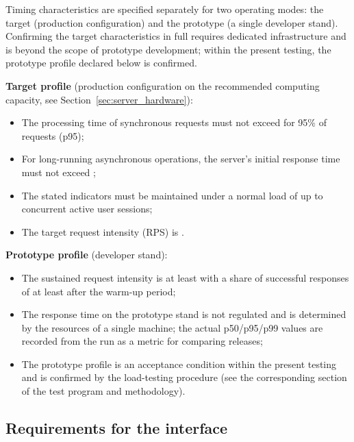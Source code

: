 \documentclass[12pt,a4paper]{extarticle}
\begin{document}
\begin{hseExample}
Timing characteristics are specified separately for two operating modes: the target (production configuration) and the prototype (a single developer stand). Confirming the target characteristics in full requires dedicated infrastructure and is beyond the scope of prototype development; within the present testing, the prototype profile declared below is confirmed.

\textbf{Target profile} (production configuration on the recommended computing capacity, see Section~\ref{sec:server_hardware}):
\begin{itemize}[leftmargin=1.25cm]
    \item The processing time of synchronous requests must not exceed  for 95\% of requests (p95);
    \item For long-running asynchronous operations, the server's initial response time must not exceed ;
    \item The stated indicators must be maintained under a normal load of up to  concurrent active user sessions;
    \item The target request intensity (RPS) is .
\end{itemize}

\textbf{Prototype profile} (developer stand):
\begin{itemize}[leftmargin=1.25cm]
    \item The sustained request intensity is at least  with a share of successful responses of at least  after the warm-up period;
    \item The response time on the prototype stand is not regulated and is determined by the resources of a single machine; the actual p50/p95/p99 values are recorded from the run as a metric for comparing releases;
    \item The prototype profile is an acceptance condition within the present testing and is confirmed by the load-testing procedure (see the corresponding section of the test program and methodology).
\end{itemize}
\end{hseExample}

\subsection{Requirements for the interface}
\label{sec:interface_reqs}
\end{document}
